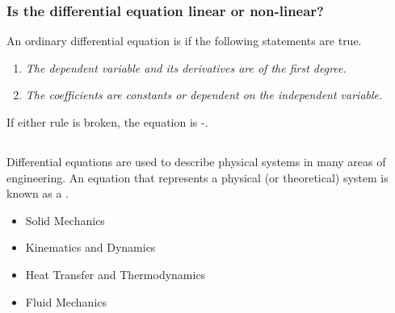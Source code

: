 \documentclass[fleqn]{beamer} %
\newcommand{\sectionIsubsectionIIItitle}{}
\newcommand{\sectionIsubsectionIVtitle}{}
\begin{document}
			\begin{frame} 
				\frametitle{\sectionIsubsectionIIItitle}
				\bigskip

				\frametitle{Is the differential equation linear or non-linear?}

An ordinary differential equation is \underline{\hspace{30mm}} if the following statements are true. \vspace{5mm}\\

\begin{enumerate}
\item {\it The dependent variable and its derivatives are of the first degree.} \vspace{3mm}\\

\item {\it The coefficients are constants or dependent on the independent variable.}\vspace{3mm}\\
\end{enumerate}

If either rule is broken, the equation is \underline{\hspace{10mm}}-\underline{\hspace{30mm}}.

			 
				\btVFill
			\end{frame}	



		\subsection{\sectionIsubsectionIVtitle}\label{sectionIsubsectionIV}	

			\begin{frame}
				\frametitle{\sectionIsubsectionIVtitle}
				\bigskip


Differential equations are used to describe physical systems in many areas of engineering. An equation that represents a physical (or theoretical) system is known as a \underline{\hspace{50mm}}\hspace{3mm}\underline{\hspace{50mm}}.\vspace{3mm}\\
\begin{itemize}

	\item Solid Mechanics \vspace{3mm}\\
	\item Kinematics and Dynamics \vspace{3mm}\\
	\item Heat Transfer and Thermodynamics \vspace{3mm}\\
	\item Fluid Mechanics
			
\end{itemize}


				\btVFill
			\end{frame}
	
\end{document}
